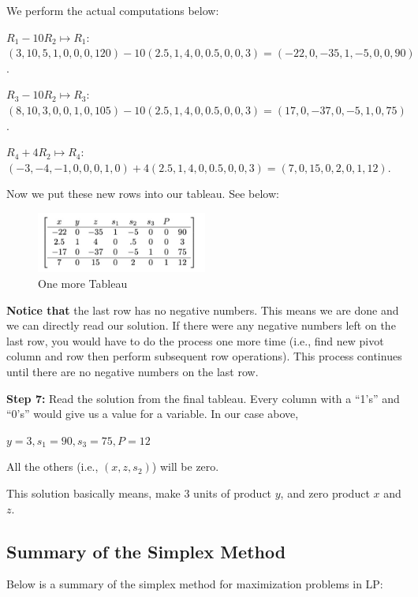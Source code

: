 \documentclass[
  letterpaper,
  DIV=11,
  numbers=noendperiod]{scrreprt}
\begin{document}
We perform the actual computations below:

\(R_1 - 10R_2\mapsto R_1\):
\((3,10,5,1,0,0,0,120) - 10(2.5,1,4,0,0.5,0,0,3)=(-22,0,-35,1,-5,0,0,90)\).

\(R_3 - 10R_2\mapsto R_3\):
\((8,10,3,0,0,1,0,105) - 10(2.5,1,4,0,0.5,0,0,3)=(17,0,-37,0,-5,1,0,75)\).

\(R_4 + 4R_2\mapsto R_4\):
\((-3,-4,-1,0,0,0,1,0) + 4(2.5,1,4,0,0.5,0,0,3)=(7,0,15,0,2,0,1,12)\).

Now we put these new rows into our tableau. See below:

\begin{figure}

{\centering \includegraphics[width=0.5\textwidth,height=\textheight]{images/g.jpeg}

}

\caption{One more Tableau}

\end{figure}

\textbf{Notice that} the last row has no negative numbers. This means we
are done and we can directly read our solution. If there were any
negative numbers left on the last row, you would have to do the process
one more time (i.e., find new pivot column and row then perform
subsequent row operations). This process continues until there are no
negative numbers on the last row.

\textbf{Step 7:} Read the solution from the final tableau. Every column
with a ``1's'' and ``0's'' would give us a value for a variable. In our
case above,

\(y=3, s_1=90, s_3=75, P=12\)

All the others (i.e., \((x,z,s_2)\)) will be zero.

This solution basically means, make 3 units of product \(y\), and zero
product \(x\) and \(z\).

\hypertarget{summary-of-the-simplex-method}{%
\subsection{Summary of the Simplex
Method}\label{summary-of-the-simplex-method}}

Below is a summary of the simplex method for maximization problems in
LP:
\end{document}
